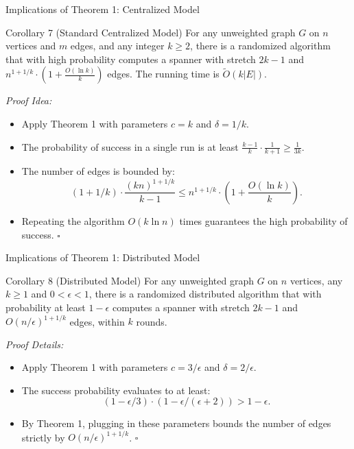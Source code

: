 \documentclass{beamer}
\begin{document}
\begin{frame}{Implications of Theorem 1: Centralized Model}
    \begin{block}{Corollary 7 (Standard Centralized Model)}
        For any unweighted graph $G$ on $n$ vertices and $m$ edges, and any integer $k \ge 2$, there is a randomized algorithm that with high probability computes a spanner with stretch $2k - 1$ and $n^{1+1/k} \cdot \left(1 + \frac{O(\ln k)}{k}\right)$ edges. The running time is $\tilde{O}(k|E|)$.
    \end{block}
    
    \vspace{0.2cm}
    \small
    \textit{Proof Idea:}
    \begin{itemize}
        \item Apply Theorem 1 with parameters $c = k$ and $\delta = 1/k$.
        \item The probability of success in a single run is at least $\frac{k-1}{k} \cdot \frac{1}{k+1} \ge \frac{1}{3k}$.
        \item The number of edges is bounded by:
        \[ (1 + 1/k) \cdot \frac{(kn)^{1+1/k}}{k - 1} \le n^{1+1/k} \cdot \left(1 + \frac{O(\ln k)}{k}\right) . \]
        \item Repeating the algorithm $O(k \ln n)$ times guarantees the high probability of success. \hfill $\square$
    \end{itemize}
\end{frame}

\begin{frame}{Implications of Theorem 1: Distributed Model}
    \begin{block}{Corollary 8 (Distributed Model)}
        For any unweighted graph $G$ on $n$ vertices, any $k \ge 1$ and $0 < \epsilon < 1$, there is a randomized distributed algorithm that with probability at least $1 - \epsilon$ computes a spanner with stretch $2k - 1$ and $O(n/\epsilon)^{1+1/k}$ edges, within $k$ rounds.
    \end{block}
    
    \vspace{0.3cm}
    \small
    \textit{Proof Details:}
    \begin{itemize}
        \item Apply Theorem 1 with parameters $c = 3/\epsilon$ and $\delta = 2/\epsilon$.
        \item The success probability evaluates to at least:
        \[ (1 - \epsilon/3) \cdot (1 - \epsilon/(\epsilon + 2)) > 1 - \epsilon . \]
        \item By Theorem 1, plugging in these parameters bounds the number of edges strictly by $O(n/\epsilon)^{1+1/k}$. \hfill $\square$
    \end{itemize}
\end{frame}
\end{document}
